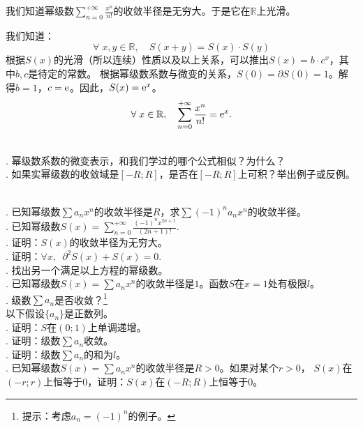 \documentclass[12pt,UTF8,fontset=none]{ctexbook}
\begin{document}
\begin{so}
    我们知道幂级数$\sum_{n=0}^{+\infty} \frac{x^n}{n!}$的收敛半径是无穷大。于是它在$\mathbb{R}$上光滑。

    我们知道：
    $$ \forall \; x, y \in \mathbb{R}, \quad S(x + y) = S(x)\cdot S(y) $$
    根据$S(x)$的光滑（所以连续）性质以及以上关系，可以推出$S(x) = b\cdot c^x$，其中$b,c$是待定的常数。
    根据幂级数系数与微变的关系，$S(0) = \partial S(0) = 1$。解得$b=1$，$c=\mathrm{e}$。因此，$S(x) = \mathrm{e}^x$。
    $$ \forall \;x\in\mathbb{R}, \quad \sum_{n=0}^{+\infty} \frac{x^n}{n!} = \mathrm{e}^x. $$
\end{so}


\begin{sk}
    \mbox{} \\
    . 幂级数系数的微变表示，和我们学过的哪个公式相似？为什么？\\
    . 如果实幂级数的收敛域是$[-R;R]$，是否在$[-R;R]$上可积？举出例子或反例。
\end{sk}

\begin{xt}    
    \mbox{} \\
    . 已知幂级数$\sum a_n x^n$的收敛半径是$R$，求$\sum (-1)^n a_n x^n$的收敛半径。\\
    . 已知幂级数$S(x) = \sum_{n=0}^{+\infty} \frac{(-1)^n x^{2n+1}}{(2n+1)!}. $\\
    . 证明：$S(x)$的收敛半径为无穷大。\\
    . 证明：$\forall x,\,\,\,\partial^2 S(x) + S(x) = 0.$ \\
    . 找出另一个满足以上方程的幂级数。\\
    . 已知幂级数$S(x) = \sum a_n x^n$的收敛半径是$1$。函数$S$在$x=1$处有极限$l$。\\
    . 级数$\sum a_n$是否收敛？\footnote{提示：考虑$a_n = (-1)^n$的例子。}\\
    \indent 以下假设$\{a_n\}$是正数列。\\
    . 证明：$S$在$(0;1)$上单调递增。\\
    . 证明：级数$\sum a_n$收敛。\\
    . 证明：级数$\sum a_n$的和为$l$。\\
    . 已知幂级数$S(x) = \sum a_n x^n$的收敛半径是$R>0$。如果对某个$r>0$，
    $S(x)$在$(-r;r)$上恒等于$0$，证明：$S(x)$在$(-R;R)$上恒等于$0$。
\end{xt}
\end{document}
